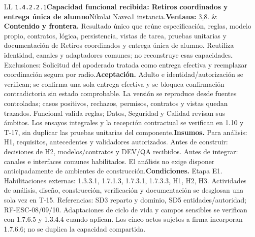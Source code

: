 \begin{longtable}{L{\tabcolsep\relax}L{\tabcolsep\relax}}
\texttt{1.\allowbreak{}4.\allowbreak{}2.\allowbreak{}2.\allowbreak{}1}\newline{}\textbf{Capacidad funcional recibida: Retiros coordinados y entrega única de alumno}\newline{}Nikolai Navea\newline{}1 instancia.\newline{}\textbf{Ventana:} 3,8. & \textbf{Contenido y frontera.} Resultado único que reúne especificación, reglas, modelo propio, contratos, lógica, persistencia, vistas de tarea, pruebas unitarias y documentación de Retiros coordinados y entrega única de alumno. Reutiliza identidad, canales y adaptadores comunes; no reconstruye esas capacidades. Exclusiones: Solicitud del apoderado tratada como entrega efectiva y reemplazar coordinación segura por radio.\newline{}\textbf{Aceptación.} Adulto e identidad/autorización se verifican; se confirma una sola entrega efectiva y se bloquea confirmación contradictoria sin estado comprobable. La versión se reproduce desde fuentes controladas; casos positivos, rechazos, permisos, contratos y vistas quedan trazados. Funcional valida reglas; Datos, Seguridad y Calidad revisan sus ámbitos. Los ensayos integrales y la recepción contractual se verifican en 1.10 y T-17, sin duplicar las pruebas unitarias del componente.\newline{}\textbf{Insumos.} Para análisis: H1, requisitos, antecedentes y validadores autorizados. Antes de construir: decisiones de H2, modelos/contratos y DEV/QA recibidos. Antes de integrar: canales e interfaces comunes habilitados. El análisis no exige disponer anticipadamente de ambientes de construcción.\newline{}\textbf{Condiciones.} Etapa E1. Habilitaciones externas: 1.3.3.1, 1.7.1.3, 1.7.3.1, 1.7.3.3, H1, H2, H3. Actividades de análisis, diseño, construcción, verificación y documentación se desglosan una sola vez en T-15. Referencias: SD3 reparto y dominio, SD5 entidades/autoridad; RF-ESC-08/09/10. Adaptaciones de ciclo de vida y campos sensibles se verifican con 1.7.6.5 y 1.3.4.4 cuando aplican. Los cinco actos sujetos a firma incorporan 1.7.6.6; no se duplica la capacidad compartida.\\\hline

\end{longtable}

